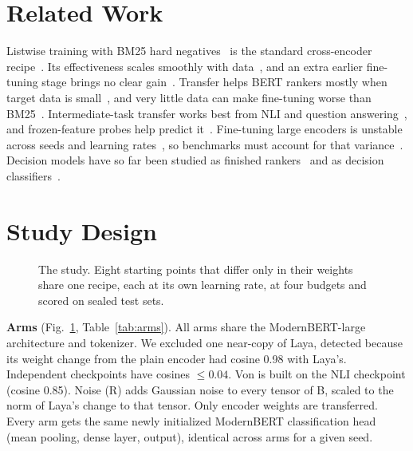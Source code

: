 \documentclass[conference]{IEEEtran}
\begin{document}
\section{Related Work}

Listwise training with BM25 hard negatives~\cite{robertson2009bm25} is the standard cross-encoder recipe~\cite{gao2021rethink,nogueira2020monot5}. Its effectiveness scales smoothly with data~\cite{seetharaman2026scaling}, and an extra earlier fine-tuning stage brings no clear gain~\cite{pezzuti2025multistage}. Transfer helps BERT rankers mostly when target data is small~\cite{mokrii2021transfer}, and very little data can make fine-tuning worse than BM25~\cite{zhang2020littlebit}. Intermediate-task transfer works best from NLI and question answering~\cite{pruksachatkun2020intermediate,vu2020transferability}, and frozen-feature probes help predict it~\cite{poth2021pretrain}. Fine-tuning large encoders is unstable across seeds and learning rates~\cite{dodge2020finetuning,mosbach2021stability,zhang2021revisiting}, so benchmarks must account for that variance~\cite{bouthillier2021variance}. Decision models have so far been studied as finished rankers~\cite{dinzinger2026systemone,li2026replace} and as decision classifiers~\cite{rastogi2026smallheads}.

\section{Study Design}

\begin{figure}[t]
\centering
\resizebox{\textwidth}{!}{}
\caption{The study. Eight starting points that differ only in their weights share one recipe, each at its own learning rate, at four budgets and scored on sealed test sets.}
\label{fig:design}
\end{figure}

\textbf{Arms} (Fig.~\ref{fig:design}, Table~\ref{tab:arms}). All arms share the ModernBERT-large architecture and tokenizer. We excluded one near-copy of Laya, detected because its weight change from the plain encoder had cosine 0.98 with Laya's. Independent checkpoints have cosines $\leq0.04$. Von is built on the NLI checkpoint (cosine 0.85). Noise (R) adds Gaussian noise to every tensor of B, scaled to the norm of Laya's change to that tensor. Only encoder weights are transferred. Every arm gets the same newly initialized ModernBERT classification head (mean pooling, dense layer, output), identical across arms for a given seed.
\end{document}
